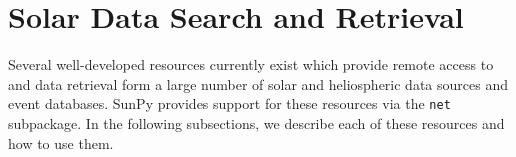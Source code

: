 \section{Solar Data Search and Retrieval}\label{sec:retrieval}

Several well-developed resources currently exist which provide remote access to 
and data retrieval form a large number of solar and heliospheric data sources 
and event databases. SunPy provides support for these resources via the 
\texttt{net} subpackage. In the following subsections, we describe each of 
these resources and how to use them.






